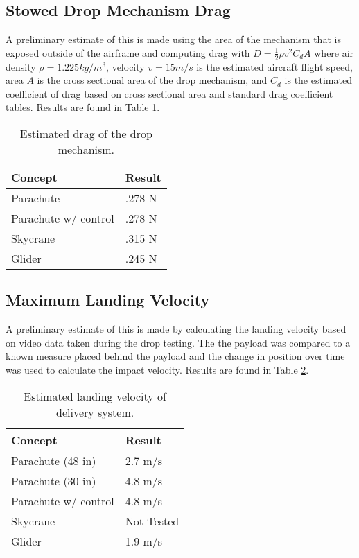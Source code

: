 \documentclass[]{auvsi_doc}
\begin{document}
	\subsection{Stowed Drop Mechanism Drag}                                   


	A preliminary estimate of this is made using the area of the mechanism that is exposed outside of the airframe and computing drag with $D = \frac{1}{2}\rho v^2 C_d A$ where air density $\rho = 1.225 kg/m^3$, velocity $v = 15 m/s$ is the estimated aircraft flight speed, area $A$ is the cross sectional area of the drop mechanism, and $C_d$ is the estimated coefficient of drag based on cross sectional area and standard drag coefficient tables. Results are found in Table \ref{drag}.
	

	\begin{table}[!h]
	\centering

	\caption{Estimated drag of the drop mechanism.}
\label{drag}
	\begin{tabular}{|l|l|}
		\hline
		\rowcolor[HTML]{C0C0C0}
		\textbf{Concept}       & \textbf{Result} \\
		\hline
		Parachute              &        .278 N        \\
		Parachute w/ control   &    	.278 N            \\
		Skycrane               &        .315 N         \\
		Glider                 &		.245 N		 \\
		\hline
	\end{tabular}
	\end{table}
	\subsection{Maximum Landing Velocity}

	
	A preliminary estimate of this is made by calculating the landing velocity based on video data taken during the drop testing. The the payload was compared to a known measure placed behind the payload and the change in position over time was used to calculate the impact velocity. Results are found in Table \ref{vel}.


	\begin{table}[!h]
	\centering

	\caption{Estimated landing velocity of delivery system.}
	\label{vel}
	\begin{tabular}{|l|l|}
		\hline
		\rowcolor[HTML]{C0C0C0}
		\textbf{Concept}       & \textbf{Result} \\
		\hline
		Parachute (48 in)              &        2.7 m/s         \\
		Parachute (30 in)		&	4.8 m/s\\
		Parachute w/ control   &                4.8 m/s \\
		Skycrane               &                 Not Tested\\
		Glider                 &			1.9 m/s	 \\
		\hline
	\end{tabular}
	\end{table}
\end{document}
